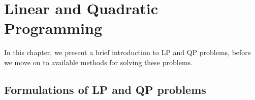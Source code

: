 \chapter{Linear and Quadratic Programming}
\label{ch:background}

In this chapter, we present a brief introduction to LP
and QP problems, before we move on to
available methods for solving these problems.

\section{Formulations of LP and QP problems}
\label{sec:backlp}


%

